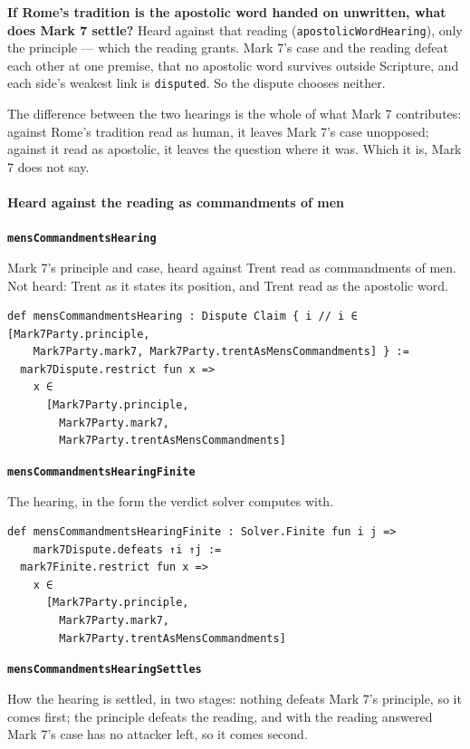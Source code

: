 \documentclass[11pt]{article}
\begin{document}
\textbf{If Rome's tradition is the apostolic word handed on unwritten, what does Mark 7 settle?} Heard against that reading (\texttt{apostolic\allowbreak{}Word\allowbreak{}Hearing}), only the principle — which the reading grants. Mark 7's case and the reading defeat each other at one premise, that no apostolic word survives outside Scripture, and each side's weakest link is \texttt{disputed}. So the dispute chooses neither.

The difference between the two hearings is the whole of what Mark 7 contributes: against Rome's tradition read as human, it leaves Mark 7's case unopposed; against it read as apostolic, it leaves the question where it was. Which it is, Mark 7 does not say.

\paragraph*{Heard against the reading as commandments of men}
\leavevmode\par
\par\medskip\noindent\textbf{\texttt{mens\allowbreak{}Commandments\allowbreak{}Hearing}}\par\nobreak\noindent
Mark 7's principle and case, heard against Trent read as commandments of men. Not heard: Trent as it states its position, and Trent read as the apostolic word.

{\small\begin{verbatim}
def mensCommandmentsHearing : Dispute Claim { i // i ∈ [Mark7Party.principle,
    Mark7Party.mark7, Mark7Party.trentAsMensCommandments] } :=
  mark7Dispute.restrict fun x =>
    x ∈
      [Mark7Party.principle,
        Mark7Party.mark7,
        Mark7Party.trentAsMensCommandments]
\end{verbatim}}
\par\medskip\noindent\textbf{\texttt{mens\allowbreak{}Commandments\allowbreak{}Hearing\allowbreak{}Finite}}\par\nobreak\noindent
The hearing, in the form the verdict solver computes with.

{\small\begin{verbatim}
def mensCommandmentsHearingFinite : Solver.Finite fun i j =>
    mark7Dispute.defeats ↑i ↑j :=
  mark7Finite.restrict fun x =>
    x ∈
      [Mark7Party.principle,
        Mark7Party.mark7,
        Mark7Party.trentAsMensCommandments]
\end{verbatim}}
\par\medskip\noindent\textbf{\texttt{mens\allowbreak{}Commandments\allowbreak{}Hearing\allowbreak{}Settles}}\par\nobreak\noindent
How the hearing is settled, in two stages: nothing defeats Mark 7's principle, so it comes first; the principle defeats the reading, and with the reading answered Mark 7's case has no attacker left, so it comes second.
\end{document}
